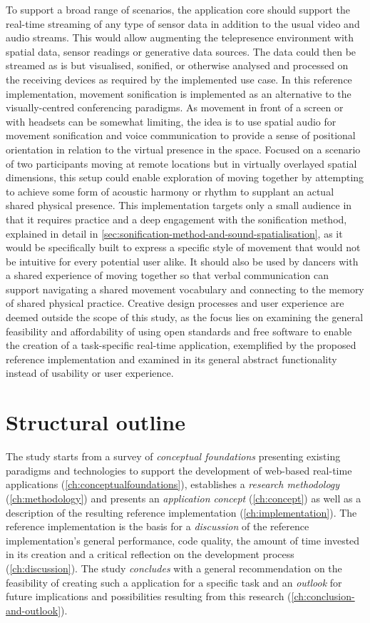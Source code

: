 To support a broad range of scenarios, the application core should support the real-time streaming of any type of sensor data in addition to the usual video and audio streams.
This would allow augmenting the telepresence environment with spatial data, sensor readings or generative data sources.
The data could then be streamed as is but visualised, sonified, or otherwise analysed and processed on the receiving devices as required by the implemented use case.
In this reference implementation, movement sonification is implemented as an alternative to the visually-centred conferencing paradigms.
As movement in front of a screen or with headsets can be somewhat limiting, the idea is to use spatial audio for movement sonification and voice communication to provide a sense of positional orientation in relation to the virtual presence in the space.
Focused on a scenario of two participants moving at remote locations but in virtually overlayed spatial dimensions, this setup could enable exploration of moving together by attempting to achieve some form of acoustic harmony or rhythm to supplant an actual shared physical presence.
This implementation targets only a small audience in that it requires practice and a deep engagement with the sonification method, explained in detail in \autoref{sec:sonification-method-and-sound-spatialisation}, as it would be specifically built to express a specific style of movement that would not be intuitive for every potential user alike.
It should also be used by dancers with a shared experience of moving together so that verbal communication can support navigating a shared movement vocabulary and connecting to the memory of shared physical practice.
Creative design processes and user experience are deemed outside the scope of this study, as the focus lies on examining the general feasibility and affordability of using open standards and free software to enable the creation of a task-specific real-time application, exemplified by the proposed reference implementation and examined in its general abstract functionality instead of usability or user experience.

\section{Structural outline}
\label{sec:outline}

The study starts from a survey of \emph{conceptual foundations} presenting existing paradigms and technologies to support the development of web-based real-time applications (\autoref{ch:conceptualfoundations}), establishes a \emph{research methodology} (\autoref{ch:methodology}) and presents an \emph{application concept} (\autoref{ch:concept}) as well as a description of the resulting {reference implementation} (\autoref{ch:implementation}).
The reference implementation is the basis for a \emph{discussion} of the reference implementation's general performance, code quality, the amount of time invested in its creation and a critical reflection on the development process (\autoref{ch:discussion}).
The study \emph{concludes} with a general recommendation on the feasibility of creating such a  application for a specific task and an \emph{outlook} for future implications and possibilities resulting from this research (\autoref{ch:conclusion-and-outlook}).
